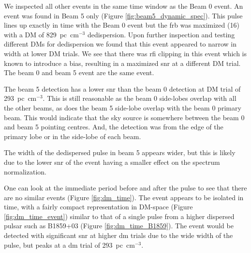 \documentclass[a4paper,fleqn,usenatbib]{mnras}
\begin{document}
We inspected all other events in the same time window as the Beam 0 event. An
event was found in Beam 5 only (Figure \ref{fig:beam5_dynamic_spec}). This pulse
lines up exactly in time with the Beam 0 event but the \gls{frb} was maximized
(16) with a DM of 829~pc~cm$^{-3}$ dedispersion. Upon further inspection and
testing different DMs for dedispersion we found that this event appeared to
narrow in width at lower DM trials. We see that there was \gls{rfi} clipping in
this event which is known to introduce a bias, resulting in a maximized
\gls{snr} at a different DM trial. The beam 0 and beam 5 event are the same
event.

The beam 5 detection has a lower \gls{snr} than the beam 0 detection at DM trial
of 293~pc~cm$^{-3}$. This is still reasonable as the beam 0 side-lobes overlap
with all the other beams, as does the beam 5 side-lobe overlap with the beam 0
primary beam. This would indicate that the sky source is somewhere between the
beam 0 and beam 5 pointing centres. And, the detection was from the edge of the
primary lobe or in the side-lobe of each beam.

The width of the dedispersed pulse in beam 5 appears wider, but this is likely
due to the lower \gls{snr} of the event having a smaller effect on the
spectrum normalization.

One can look at the immediate period before and after the pulse to see that
there are no similar events (Figure \ref{fig:dm_time}). The event appears to be
isolated in time, with a fairly compact representation in DM-space (Figure
\ref{fig:dm_time_event}) similar to that of a single pulse from a higher
dispersed pulsar such as B1859+03 (Figure \ref{fig:dm_time_B1859}). The event
would be detected with significant \gls{snr} at higher \gls{dm} trials due to
the wide width of the pulse, but peaks at a \gls{dm} trial of 293~pc~cm$^{-3}$.
\end{document}
